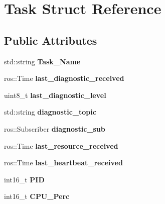 \hypertarget{structTask}{}\section{Task Struct Reference}
\label{structTask}
\subsection*{Public Attributes}
\begin{DoxyCompactItemize}
\item 
\mbox{\label{structTask_a340aafe707babbe6a3dbd551ff280f51}} 
std\+::string {\bfseries Task\+\_\+\+Name}
\item 
\mbox{\label{structTask_a65066934fb2b710b347a56be21cd10a6}} 
ros\+::\+Time {\bfseries last\+\_\+diagnostic\+\_\+received}
\item 
\mbox{\label{structTask_a08dac9a0b5f112c6efd8f4435380806f}} 
uint8\+\_\+t {\bfseries last\+\_\+diagnostic\+\_\+level}
\item 
\mbox{\label{structTask_aa95ad8dda783a9c3ee3c82913dd6a779}} 
std\+::string {\bfseries diagnostic\+\_\+topic}
\item 
\mbox{\label{structTask_ae089937f65c6cf6afc142ba95a734e99}} 
ros\+::\+Subscriber {\bfseries diagnostic\+\_\+sub}
\item 
\mbox{\label{structTask_ab252497633e183b1051f554c4cb38182}} 
ros\+::\+Time {\bfseries last\+\_\+resource\+\_\+received}
\item 
\mbox{\label{structTask_aa094dcf427e00599aecccc0da79ce479}} 
ros\+::\+Time {\bfseries last\+\_\+heartbeat\+\_\+received}
\item 
\mbox{\label{structTask_a19005e99edab9f13c30380a2e3b7478c}} 
int16\+\_\+t {\bfseries P\+ID}
\item 
\mbox{\label{structTask_adc8d232d26cfff76fa6025160a351c1b}} 
int16\+\_\+t {\bfseries C\+P\+U\+\_\+\+Perc}
\item 
\mbox{\label{structTask_adfe85ae74bd6ad25377eeaa4b1c6182c}} 

\end{DoxyCompactItemize}
